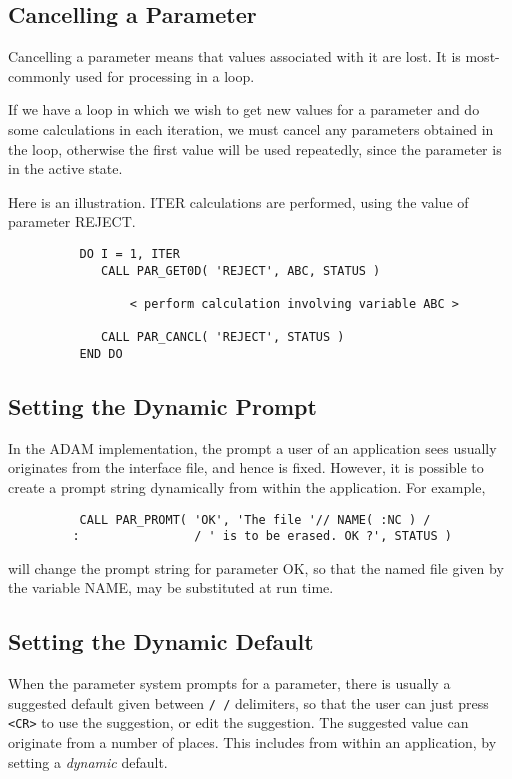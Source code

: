 \documentclass[twoside,11pt]{article}
\newcommand{\xlabel}[1]{}
\begin{document}
\subsection{\xlabel{cancelling_a_parameter}Cancelling a Parameter}

Cancelling a parameter means that values associated with it are lost.
It is most-commonly used for processing in a loop. 

If we have a loop in which we wish to get new values for a parameter and
do some calculations in each iteration, we must cancel any parameters
obtained in the loop, otherwise the first value will be used repeatedly,
since the parameter is in the active state.

Here is an illustration.  ITER calculations are performed, using
the value of parameter REJECT.

\begin{verbatim}
          DO I = 1, ITER
             CALL PAR_GET0D( 'REJECT', ABC, STATUS )

                 < perform calculation involving variable ABC >

             CALL PAR_CANCL( 'REJECT', STATUS )
          END DO
\end{verbatim}

\subsection{\xlabel{setting_the_dynamic_prompt}Setting the Dynamic Prompt}

In the ADAM implementation, the prompt a user of an application sees
usually originates from the interface file, and hence is fixed. 
However, it is possible to create a prompt string dynamically from
within the application. For example, 

\begin{verbatim}
          CALL PAR_PROMT( 'OK', 'The file '// NAME( :NC ) /
         :                / ' is to be erased. OK ?', STATUS )
\end{verbatim}

will change the prompt string for parameter OK, so that the named
file given by the variable NAME, may be substituted at run time. 

\subsection{\xlabel{setting_the_dynamic_default}Setting the Dynamic Default}

When the parameter system prompts for a parameter, there is usually a
suggested default given between {\tt / /} delimiters, so that the user
can just press {\tt <CR>} to use the suggestion, or edit the suggestion.
The suggested value can originate from a number of places.  This
includes from within an application, by setting a {\em dynamic\/}
default. 
\end{document}
